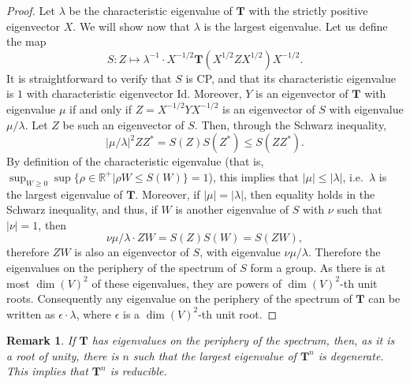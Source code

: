 \documentclass{article}
\newtheorem{remark}{Remark}
\newcommand{\id}{\mathrm{Id}}
\begin{document}
\begin{proof}
  Let $\lambda$ be the characteristic eigenvalue of $\mathbf{T}$ with the strictly positive eigenvector $X$. We will show now that $\lambda$ is the largest eigenvalue. Let us define the map 
  \begin{equation*}
    S: Z \mapsto \lambda^{-1} \cdot X^{-1/2}\mathbf{T}(X^{1/2} Z X^{1/2}) X^{-1/2}.
  \end{equation*}
  It is straightforward to verify that $S$ is CP, and that its characteristic eigenvalue is $1$ with characteristic eigenvector $\id$. Moreover, $Y$ is an eigenvector of $\mathbf{T}$ with eigenvalue $\mu$ if and only if $Z = X^{-1/2} Y X^{-1/2}$ is an eigenvector of $S$ with eigenvalue $\mu/\lambda$. Let $Z$ be such an eigenvector of $S$. Then, through the Schwarz inequality,
  \begin{equation*}
    |\mu/\lambda|^2 Z Z^* = S(Z) S(Z^*) \leq S(ZZ^*).
  \end{equation*}
  By definition of the characteristic eigenvalue (that is, $\sup_{W\geq 0}\sup\{\rho\in \mathbb{R}^+ | \rho W \leq S (W)\} = 1$), this implies that $|\mu|\leq |\lambda|$, i.e.\ $\lambda$ is the largest eigenvalue of $\mathbf{T}$. Moreover, if $|\mu| = |\lambda|$, then equality holds in the Schwarz inequality, and thus, if $W$ is another eigenvalue of $S$ with $\nu$ such that $|\nu|=1$, then 
  \begin{equation*}
    \nu \mu/ \lambda \cdot ZW = S(Z) S(W)  =  S(ZW),
  \end{equation*}
  therefore $ZW$ is also an eigenvector of $S$, with eigenvalue $\nu\mu/\lambda$. Therefore the eigenvalues on the periphery of the spectrum of $S$ form a group. As there is at most $\dim(V)^2$ of these eigenvalues, they are powers of $\dim(V)^2$-th unit roots. Consequently any eigenvalue on the periphery of the spectrum of $\mathbf{T}$ can be written as $\epsilon\cdot \lambda$, where $\epsilon$ is a $\dim(V)^2$-th unit root.
\end{proof}


\begin{remark}
  If $\mathbf{T}$ has eigenvalues on the periphery of the spectrum, then, as it is a root of unity, there is $n$ such that the largest eigenvalue of $\mathbf{T}^n$ is degenerate. This implies that $\mathbf{T}^n$ is reducible. 
\end{remark}
\end{document}
